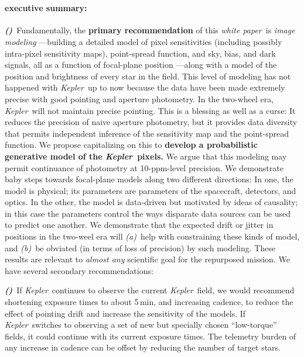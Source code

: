 \documentclass[letterpaper,12pt,preprint]{aastex}
\newcommand{\documentname}{\textsl{white paper}}
\newcommand{\observatory}[1]{\textsl{#1}}
\newcommand{\Kepler}{\observatory{Kepler}}
\newcounter{hoggitem}
\newcommand{\hoggitem}{\refstepcounter{hoggitem}\textbf{\textsl{(\thehoggitem)}}}
\begin{document}
~
\clearpage

\paragraph{executive summary:}
\hoggitem~Fundamentally, the \textbf{primary recommendation} of this \documentname\
  is \emph{image modeling}%
  ---building a detailed model of pixel sensitivities
  (including possibly intra-pixel sensitivity maps),
  point-spread function,
  and sky, bias, and dark signals,
  all as a function of focal-plane position%
  ---along with a model of the position and brightness of every star in the field.
This level of modeling has not happened with \Kepler\ up to now
  because the data have been made extremely precise with good pointing
  and aperture photometry.
In the two-wheel era, \Kepler\ will not maintain precise pointing.
This is a blessing as well as a curse:
It reduces the precision of naive aperture photometry,
  but it provides data diversity that permits independent inference
  of the sensitivity map and the point-spread function.
We propose capitalizing on this to
  \textbf{develop a probabilistic generative model of the \Kepler\ pixels.}
We argue that this modeling may permit continuance of photometry at 10-ppm-level precision.
We demonstrate baby steps towards focal-plane models
  along two different directions:
In one, the model is physical;
  its parameters are parameters of the spacecraft, detectors, and optics.
In the other, the model is data-driven but motivated by ideas of causality;
  in this case the parameters control the ways
  disparate data sources can be used to predict one another.
We demonstrate that the expected drift or jitter in positions in the two-weel era
  will \textsl{(a)}~help with constraining these kinds of model,
  and \textsl{(b)}~be obviated (in terms of loss of precision) by such modeling.
These results are relevant to \emph{almost any} scientific goal for the repurposed mission.
We have several secondary recommendations:

\hoggitem~If \Kepler\ continues to observe the current \Kepler\ field,
  we would recommend shortening exposure times to about 5\,min, and increasing cadence,
  to reduce the effect of pointing drift and increase the sensitivity of the models.
If \Kepler\ switches to observing a set of new but specially chosen ``low-torque'' fields,
  it could continue with its current exposure times.
The telemetry burden of any increase in cadence can be offset
  by reducing the number of target stars.
\end{document}
